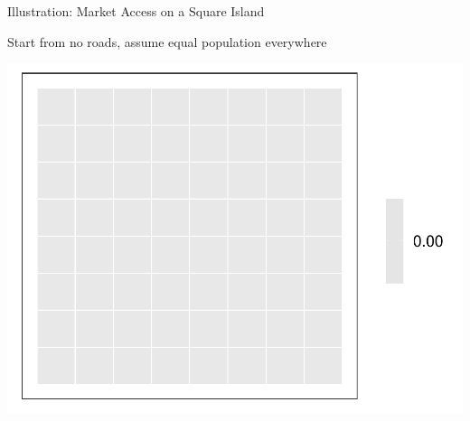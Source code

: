 \documentclass{beamer}
\begin{document}
\begin{frame}[t]{Illustration: Market Access on a Square Island} 
\vspace{-0.3cm}
	\begin{center}
		Start from no roads, assume equal population everywhere

		\includegraphics[height=0.8\textheight]{lecture_includes/empty_gridnoroads.pdf}
	\end{center}
\end{frame}
\end{document}
